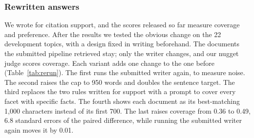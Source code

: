 \documentclass[sigconf,nonacm]{acmart}
\begin{document}
\subsubsection{Rewritten answers}
\label{sec:revised}
We wrote for citation support, and the scores released so far measure coverage and
preference. After the results we tested the obvious change on the 22 development
topics, with a design fixed in writing beforehand. The documents the submitted
pipeline retrieved stay; only the writer changes, and our nugget judge scores
coverage. Each variant adds one change to the one before (Table~\ref{tab:rerun}).
The first runs the submitted writer again, to measure noise. The second raises the
cap to 950 words and doubles the sentence target. The third replaces the two rules
written for support with a prompt to cover every facet with specific facts. The
fourth shows each document as its best-matching 1,000 characters instead of its first
700. The last raises coverage from 0.36 to 0.49, 6.8 standard errors of the paired
difference, while running the submitted writer again moves it by 0.01.
\end{document}
